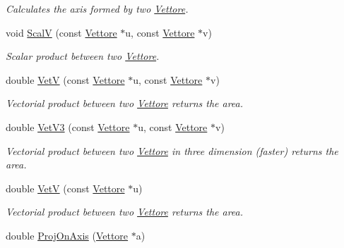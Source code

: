 \begin{DoxyCompactItemize}
\begin{DoxyCompactList}\small\item\em \-Calculates the axis formed by two \hyperlink{classVettore}{\-Vettore}. \end{DoxyCompactList}\item 
\hypertarget{classVettore_acde6fcf2886d08085f11655e0bb4fa5a}{void \hyperlink{classVettore_acde6fcf2886d08085f11655e0bb4fa5a}{\-Scal\-V} (const \hyperlink{classVettore}{\-Vettore} $\ast$u, const \hyperlink{classVettore}{\-Vettore} $\ast$v)}\label{classVettore_acde6fcf2886d08085f11655e0bb4fa5a}

\begin{DoxyCompactList}\small\item\em \-Scalar product between two \hyperlink{classVettore}{\-Vettore}. \end{DoxyCompactList}\item 
\hypertarget{classVettore_a9b3422c7c865368c649cb008c6185250}{double \hyperlink{classVettore_a9b3422c7c865368c649cb008c6185250}{\-Vet\-V} (const \hyperlink{classVettore}{\-Vettore} $\ast$u, const \hyperlink{classVettore}{\-Vettore} $\ast$v)}\label{classVettore_a9b3422c7c865368c649cb008c6185250}

\begin{DoxyCompactList}\small\item\em \-Vectorial product between two \hyperlink{classVettore}{\-Vettore} returns the area. \end{DoxyCompactList}\item 
\hypertarget{classVettore_a95399bdbce8cbb4ad68d53d914a68d76}{double \hyperlink{classVettore_a95399bdbce8cbb4ad68d53d914a68d76}{\-Vet\-V3} (const \hyperlink{classVettore}{\-Vettore} $\ast$u, const \hyperlink{classVettore}{\-Vettore} $\ast$v)}\label{classVettore_a95399bdbce8cbb4ad68d53d914a68d76}

\begin{DoxyCompactList}\small\item\em \-Vectorial product between two \hyperlink{classVettore}{\-Vettore} in three dimension (faster) returns the area. \end{DoxyCompactList}\item 
\hypertarget{classVettore_a23d7adb61da0e99cc2fab9dbab01f7d8}{double \hyperlink{classVettore_a23d7adb61da0e99cc2fab9dbab01f7d8}{\-Vet\-V} (const \hyperlink{classVettore}{\-Vettore} $\ast$u)}\label{classVettore_a23d7adb61da0e99cc2fab9dbab01f7d8}

\begin{DoxyCompactList}\small\item\em \-Vectorial product between two \hyperlink{classVettore}{\-Vettore} returns the area. \end{DoxyCompactList}\item 
\hypertarget{classVettore_a060c730e982c30a0530598d864a6e508}{double \hyperlink{classVettore_a060c730e982c30a0530598d864a6e508}{\-Proj\-On\-Axis} (\hyperlink{classVettore}{\-Vettore} $\ast$a)}\label{classVettore_a060c730e982c30a0530598d864a6e508}


\end{DoxyCompactItemize}
